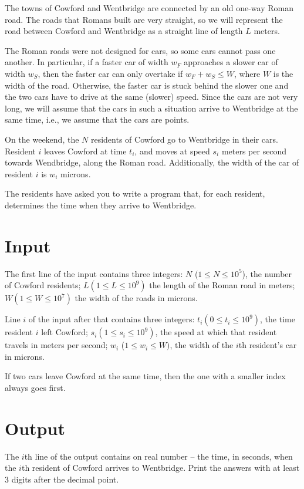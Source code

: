 The towns of Cowford and Wentbridge are connected by an old one-way Roman road.
The roads that Romans built are very straight, so we will represent the road between Cowford and Wentbridge as a straight line of length $L$ meters.

The Roman roads were not designed for cars, so some cars cannot pass one another.
In particular, if a faster car of width $w_F$ approaches a slower car of width $w_S$, then the faster car can only overtake if $w_F + w_S \leq W$,
where $W$ is the width of the road.
Otherwise, the faster car is stuck behind the slower one and the two cars have to drive at the same (slower) speed.
Since the cars are not very long, we will assume that the cars in such a situation arrive to Wentbridge at the same time, i.e., we assume that the cars are points.

On the weekend, the $N$ residents of Cowford go to Wentbridge in their cars.
Resident $i$ leaves Cowford at time $t_i$, and moves at speed $s_i$ meters per second towards Wendbridge, along the Roman road.
Additionally, the width of the car of resident $i$ is $w_i$ microns.

The residents have asked you to write a program that, for each resident, determines the time when they arrive to Wentbridge.

\section*{Input}
The first line of the input contains three integers: $N$ ($1 \leq N \leq 10^5$), the number of Cowford residents; $L (1 \leq L \leq 10^9)$ the length of the Roman road in meters; $W (1 \leq W \leq 10^7)$ the width of the roads in microns.

Line $i$ of the input after that contains three integers:
$t_i (0 \leq t_i \leq 10^9)$, the time resident $i$ left Cowford;
$s_i (1 \leq s_i \leq 10^9)$, the speed at which that resident travels in meters per second;
$w_i$ ($1 \leq w_i \leq W)$, the width of the $i$th resident's car in microns.

If two cars leave Cowford at the same time, then the one with a smaller index always goes first.

\section*{Output}
The $i$th line of the output contains on real number
-- the time, in seconds, when the $i$th resident of Cowford arrives to Wentbridge.
Print the answers with at least $3$ digits after the decimal point.